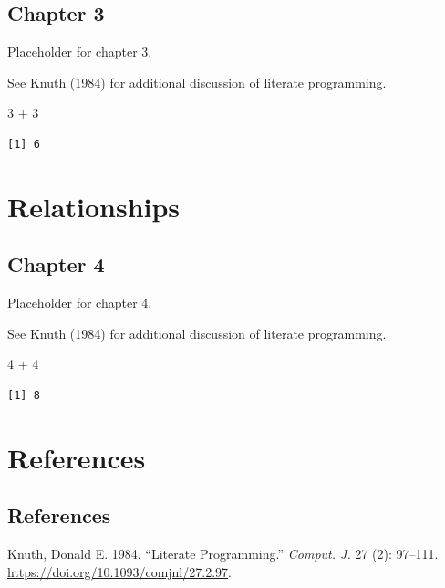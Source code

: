 \documentclass[
  letterpaper,
  DIV=11,
  numbers=noendperiod,
  oneside]{scrreprt}
\newenvironment{Shaded}{\begin{snugshade}}{\end{snugshade}}
\newcommand{\DecValTok}[1]{\textcolor[rgb]{0.68,0.00,0.00}{#1}}
\newcommand{\SpecialCharTok}[1]{\textcolor[rgb]{0.37,0.37,0.37}{#1}}
\newlength{\cslhangindent}
\newlength{\cslentryspacingunit} %
\newenvironment{CSLReferences}[2] %
 {%
  \setlength{\parindent}{0pt}
  \ifodd #1
  \let\oldpar\par
  \def\par{\hangindent=\cslhangindent\oldpar}
  \fi
  \setlength{\parskip}{#2\cslentryspacingunit}
 }%
 {}
\begin{document}
\hypertarget{chapter-3}{%
\chapter{Chapter 3}\label{chapter-3}}

Placeholder for chapter 3.

See Knuth (1984) for additional discussion of literate programming.

\begin{Shaded}
\begin{Highlighting}[]
\DecValTok{3} \SpecialCharTok{+} \DecValTok{3}
\end{Highlighting}
\end{Shaded}

\begin{verbatim}
[1] 6
\end{verbatim}

\part{Relationships}

\hypertarget{chapter-4}{%
\chapter{Chapter 4}\label{chapter-4}}

Placeholder for chapter 4.

See Knuth (1984) for additional discussion of literate programming.

\begin{Shaded}
\begin{Highlighting}[]
\DecValTok{4} \SpecialCharTok{+} \DecValTok{4}
\end{Highlighting}
\end{Shaded}

\begin{verbatim}
[1] 8
\end{verbatim}

\part{References}

\hypertarget{references-1}{%
\chapter*{References}\label{references-1}}

\hypertarget{refs}{}
\begin{CSLReferences}{1}{0}
\leavevmode{}%
Knuth, Donald E. 1984. {``Literate Programming.''} \emph{Comput. J.} 27
(2): 97--111. \url{https://doi.org/10.1093/comjnl/27.2.97}.

\end{CSLReferences}
\end{document}
